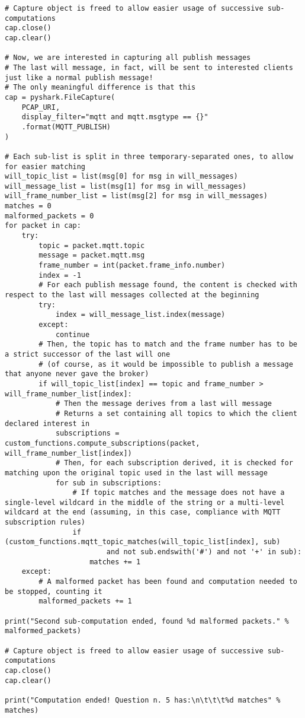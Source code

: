 \documentclass[a4paper,11pt]{article} %
\begin{document}
    \begin{verbatim}
# Capture object is freed to allow easier usage of successive sub-computations
cap.close()
cap.clear()

# Now, we are interested in capturing all publish messages
# The last will message, in fact, will be sent to interested clients just like a normal publish message!
# The only meaningful difference is that this
cap = pyshark.FileCapture(
    PCAP_URI,
    display_filter="mqtt and mqtt.msgtype == {}"
    .format(MQTT_PUBLISH)
)

# Each sub-list is split in three temporary-separated ones, to allow for easier matching
will_topic_list = list(msg[0] for msg in will_messages)
will_message_list = list(msg[1] for msg in will_messages)
will_frame_number_list = list(msg[2] for msg in will_messages)
matches = 0
malformed_packets = 0
for packet in cap:
    try:
        topic = packet.mqtt.topic
        message = packet.mqtt.msg
        frame_number = int(packet.frame_info.number)
        index = -1
        # For each publish message found, the content is checked with respect to the last will messages collected at the beginning
        try:
            index = will_message_list.index(message)
        except:
            continue
        # Then, the topic has to match and the frame number has to be a strict successor of the last will one
        # (of course, as it would be impossible to publish a message that anyone never gave the broker)
        if will_topic_list[index] == topic and frame_number > will_frame_number_list[index]:
            # Then the message derives from a last will message
            # Returns a set containing all topics to which the client declared interest in
            subscriptions = custom_functions.compute_subscriptions(packet, will_frame_number_list[index])
            # Then, for each subscription derived, it is checked for matching upon the original topic used in the last will message
            for sub in subscriptions:
                # If topic matches and the message does not have a single-level wildcard in the middle of the string or a multi-level wildcard at the end (assuming, in this case, compliance with MQTT subscription rules)
                if (custom_functions.mqtt_topic_matches(will_topic_list[index], sub)
                        and not sub.endswith('#') and not '+' in sub):
                    matches += 1
    except:
        # A malformed packet has been found and computation needed to be stopped, counting it
        malformed_packets += 1

print("Second sub-computation ended, found %d malformed packets." % malformed_packets)

# Capture object is freed to allow easier usage of successive sub-computations
cap.close()
cap.clear()

print("Computation ended! Question n. 5 has:\n\t\t\t%d matches" % matches)
    \end{verbatim}
\end{document}
